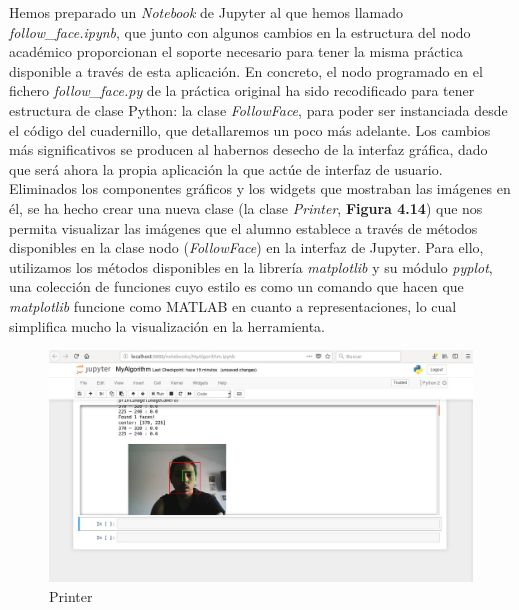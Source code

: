 Hemos preparado un \textit{Notebook} de Jupyter al que hemos llamado \textit{follow\_face.ipynb}, que junto con algunos cambios en la estructura del nodo académico proporcionan el soporte necesario para tener la misma práctica disponible a través de esta aplicación. En concreto, el nodo programado en el fichero \textit{follow\_face.py} de la práctica original ha sido recodificado para tener estructura de clase Python: la clase \textit{FollowFace}, para poder ser instanciada desde el código del cuadernillo, que detallaremos un poco más adelante. Los cambios más significativos se producen al habernos desecho de la interfaz gráfica, dado que será ahora la propia aplicación la que actúe de interfaz de usuario. Eliminados los componentes gráficos y los widgets que mostraban las imágenes en él, se ha hecho crear una nueva clase (la clase \textit{Printer}, \textbf{Figura 4.14}) que nos permita visualizar las imágenes que el alumno establece a través de métodos disponibles en la clase nodo (\textit{FollowFace}) en la interfaz de Jupyter. Para ello, utilizamos los métodos disponibles en la librería \textit{matplotlib} y su módulo \textit{pyplot},  una colección de funciones cuyo estilo es como un comando que hacen que \textit{matplotlib} funcione como MATLAB en cuanto a representaciones, lo cual simplifica mucho la visualización en la herramienta. 

\begin{figure}[H]
  \begin{center}
    \includegraphics[width=0.98\linewidth]{figures/printer.jpg}
		\caption{Printer}
		\label{fig.printer}
		\end{center}
\end{figure}

